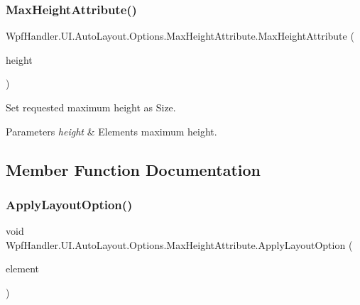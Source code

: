 \subsubsection{\texorpdfstring{Max\+Height\+Attribute()}{MaxHeightAttribute()}\hspace{0.1cm}{\footnotesize\ttfamily [2/2]}}
{\footnotesize\ttfamily Wpf\+Handler.\+U\+I.\+Auto\+Layout.\+Options.\+Max\+Height\+Attribute.\+Max\+Height\+Attribute (\begin{DoxyParamCaption}\item[{double}]{height }\end{DoxyParamCaption})}



Set requested maximum height as Size. 


\begin{DoxyParams}{Parameters}
{\em height} & Element\textquotesingle{}s maximum height.\\
\hline
\end{DoxyParams}


\subsection{Member Function Documentation}
\mbox{\label{class_wpf_handler_1_1_u_i_1_1_auto_layout_1_1_options_1_1_max_height_attribute_a1b1d850c2c5d8e59454d7f9b5271ee88}} 
\subsubsection{\texorpdfstring{Apply\+Layout\+Option()}{ApplyLayoutOption()}}
{\footnotesize\ttfamily void Wpf\+Handler.\+U\+I.\+Auto\+Layout.\+Options.\+Max\+Height\+Attribute.\+Apply\+Layout\+Option (\begin{DoxyParamCaption}\item[{Framework\+Element}]{element }\end{DoxyParamCaption})}



